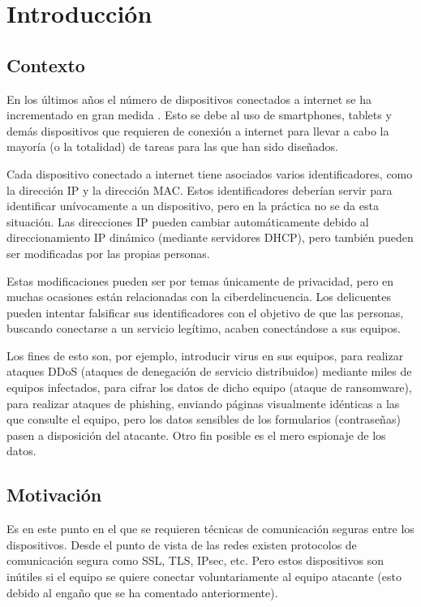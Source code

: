 
\chapter{Introducción} \label{chap:intro}

\section{Contexto}

En los últimos años el número de dispositivos conectados a internet se ha incrementado en gran medida \cite{84Billio53:online}. Esto se debe al uso de smartphones, tablets y demás dispositivos que requieren de conexión a internet para llevar a cabo la mayoría (o la totalidad) de tareas para las que han sido diseñados.

Cada dispositivo conectado a internet tiene asociados varios identificadores, como la dirección IP y la dirección MAC. Estos identificadores deberían servir para identificar unívocamente a un dispositivo, pero en la práctica no se da esta situación. Las direcciones IP pueden cambiar automáticamente debido al direccionamiento IP dinámico (mediante servidores DHCP), pero también pueden ser modificadas por las propias personas. 

Estas modificaciones pueden ser por temas únicamente de privacidad, pero en muchas ocasiones están relacionadas con la ciberdelincuencia. Los delicuentes pueden intentar falsificar sus identificadores con el objetivo de que las personas, buscando conectarse a un servicio legítimo, acaben conectándose a sus equipos.

Los fines de esto son, por ejemplo, introducir virus en sus equipos, para realizar ataques DDoS (ataques de denegación de servicio distribuidos) mediante miles de equipos infectados, para cifrar los datos de dicho equipo (ataque de ransomware), para realizar ataques de phishing, enviando páginas visualmente idénticas a las que consulte el equipo, pero los datos sensibles de los formularios (contraseñas) pasen a disposición del atacante. Otro fin posible es el mero espionaje de los datos.

\section{Motivación}

Es en este punto en el que se requieren técnicas de comunicación seguras entre los dispositivos. Desde el punto de vista de las redes existen protocolos de comunicación segura como SSL, TLS, IPsec, etc. Pero estos dispositivos son inútiles si el equipo se quiere conectar voluntariamente al equipo atacante (esto debido al engaño que se ha comentado anteriormente).

